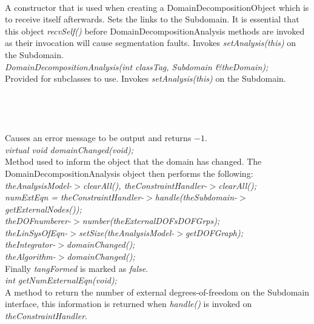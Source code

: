 \\
A constructor that is used when creating a DomainDecompositionObject which
is to receive itself afterwards. Sets the links to the Subdomain. It is
essential that this object {\em recvSelf()} before DomainDecompositionAnalysis
methods are invoked as their invocation will cause segmentation faults. 
Invokes {\em setAnalysis(this)} on the Subdomain. \\

{\em DomainDecompositionAnalysis(int classTag, Subdomain \&theDomain);}\\
Provided for subclasses to use. Invokes {\em setAnalysis(this)} on the
Subdomain. \\ 


 \\
\\ 

\\
 \\
Causes an error message to be output and returns $-1$. \\

{\em virtual void domainChanged(void);} \\
Method used to inform the object that the domain has changed. The
DomainDecompositionAnalysis object then performs the following: \\ {\em
\indent\indent theAnalysisModel-$>$clearAll(),
theConstraintHandler-$>$clearAll();\\ 
\indent\indent numExtEqn =
theConstraintHandler-$>$handle(theSubdomain-$>$getExternalNodes());\\ 
\indent\indent theDOFnumberer-$>$number(theExternalDOFsDOFGrps);  \\
\indent\indent theLinSysOfEqn-$>$setSize(theAnalysisModel-$>$getDOFGraph);  \\
\indent\indent theIntegrator-$>$domainChanged(); \\
\indent\indent theAlgorithm-$>$domainChanged(); \\ }
Finally {\em tangFormed} is marked as {\em false}. \\

{\em int getNumExternalEqn(void);} \\
A method to return the number of external degrees-of-freedom on the
Subdomain interface, this information is returned when {\em handle()}
is invoked on {\em theConstraintHandler}. \\

